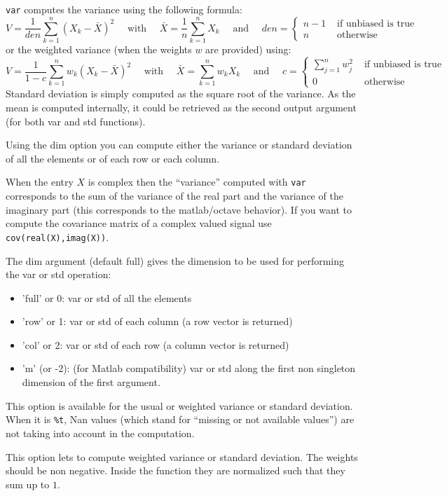 \begin{mandescription}
  \verb+var+ computes the variance using the following formula:
$$
    V = \frac{1}{den} \sum_{k=1}^n (X_k - \bar{X})^2 \quad \mbox{  with  } \quad \bar{X} = \frac{1}{n} \sum_{k=1}^n X_k
   \quad \mbox{ and } \quad  den = \left\{ \begin{array}{cl}  n-1 & \mbox{ if unbiased is true}\\
                                                       n   & \mbox{ otherwise} \end{array}\right.
$$
or the weighted variance (when the weights $w$ are provided) using:
$$
    V = \frac{1}{1 - c} \sum_{k=1}^n w_k (X_k - \bar{X})^2 \quad \mbox{  with  } \quad \bar{X} =  \sum_{k=1}^n  w_k X_k
   \quad \mbox{ and } \quad  c = \left\{ \begin{array}{cl} \sum_{j=1}^n w_j^2  & \mbox{ if unbiased is true}\\
                                                       0   & \mbox{ otherwise} \end{array}\right.
$$
Standard deviation is simply computed as the square root of the variance. As the mean is
computed internally, it could be retrieved as the second output argument (for both var and
std functions).

Using the dim option you can compute either the variance or standard deviation
of all the elements or of each row or each column. 

When the entry $X$ is complex then the ``variance'' computed with \verb+var+ corresponds 
to the sum of the variance of the real part and the variance of the imaginary part (this 
corresponds to the matlab/octave behavior). If you want to compute the covariance matrix 
of a complex valued signal use \verb+cov(real(X),imag(X))+.

  The dim argument (default full) gives the dimension to be used for performing the var or std operation:
  \begin{itemize}
    \item 'full' or 0: var or std of all the elements 
    \item 'row' or 1: var or std of each column (a row vector is returned)
    \item 'col' or 2: var or std of each row (a column vector is returned)
    \item 'm' (or -2): (for Matlab compatibility) var or std along the first non 
          singleton dimension of the first argument.
  \end{itemize}

   This option is available for the usual or weighted variance or standard deviation. 
When it is \verb+%t+,  Nan values (which stand for ``missing or not available values'') 
are not taking into account in the computation.
   
  This option lets to compute weighted variance or standard deviation. The weights should be non negative. Inside
the function they are normalized such that they sum up to $1$.
   
\end{mandescription}

